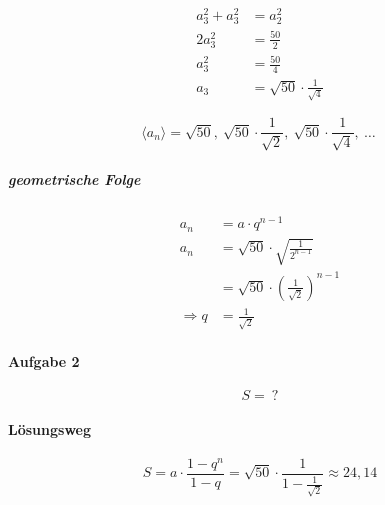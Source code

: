 \begin{align*}
    a_3^2 + a_3^2 &= a_2^2 \\
    2 a_3^2 &= \frac{50}{2} \\
    a_3^2 &= \frac{50}{4} \\
    a_3 &= \sqrt{50} \cdot \frac{1}{\sqrt{4}}
\end{align*}

\[
    \langle a_n \rangle = \sqrt{50},\ \sqrt{50} \cdot \frac{1}{\sqrt{2}},\ \sqrt{50} \cdot \frac{1}{\sqrt{4}},\ \ldots \
\]

\subparagraph{geometrische Folge}

\begin{align*}
    a_n &= a \cdot q^{n-1} \\
    a_n &= \sqrt{50} \cdot \sqrt{\frac{1}{2^{n-1}}} \\
    &= \sqrt{50} \cdot {\left(\frac{1}{\sqrt{2}}\right)}^{n-1} \\
    \Rightarrow q &= \frac{1}{\sqrt{2}}
\end{align*}

\paragraph{Aufgabe 2}

\[
    S =\ ?
\]

\paragraph{Lösungsweg}

\[
    S = a \cdot \frac{1 - q^n}{1 - q} = \sqrt{50} \cdot \frac{1}{1- \frac{1}{\sqrt{2}}} \approx 24,14
\]
